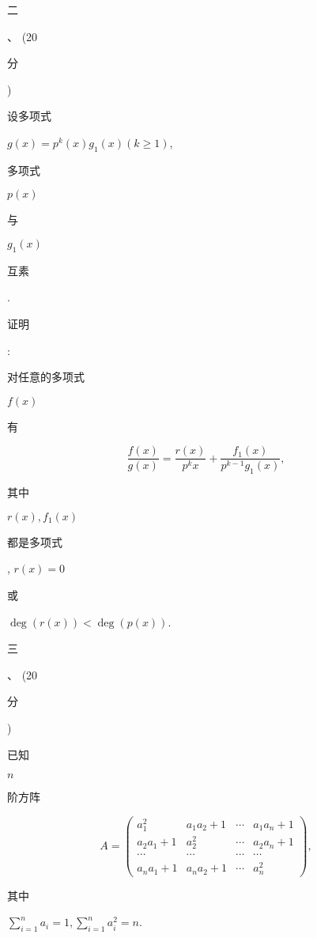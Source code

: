 \documentclass[10pt]{article}
\begin{document}
\begin{CJK}{UTF8}{mj}二\end{CJK}、 (20 \begin{CJK}{UTF8}{mj}分\end{CJK}) \begin{CJK}{UTF8}{mj}设多项式\end{CJK} $g(x)=p^{k}(x) g_{1}(x)(k \geq 1)$, \begin{CJK}{UTF8}{mj}多项式\end{CJK} $p(x)$ \begin{CJK}{UTF8}{mj}与\end{CJK} $g_{1}(x)$ \begin{CJK}{UTF8}{mj}互素\end{CJK}. \begin{CJK}{UTF8}{mj}证明\end{CJK}: \begin{CJK}{UTF8}{mj}对任意的多项式\end{CJK} $f(x)$ \begin{CJK}{UTF8}{mj}有\end{CJK}
$$
\frac{f(x)}{g(x)}=\frac{r(x)}{p^{k} x}+\frac{f_{1}(x)}{p^{k-1} g_{1}(x)},
$$
\begin{CJK}{UTF8}{mj}其中\end{CJK} $r(x), f_{1}(x)$ \begin{CJK}{UTF8}{mj}都是多项式\end{CJK}, $r(x)=0$ \begin{CJK}{UTF8}{mj}或\end{CJK} $\operatorname{deg}(r(x))<\operatorname{deg}(p(x))$.

\begin{CJK}{UTF8}{mj}三\end{CJK}、 (20 \begin{CJK}{UTF8}{mj}分\end{CJK}) \begin{CJK}{UTF8}{mj}已知\end{CJK} $n$ \begin{CJK}{UTF8}{mj}阶方阵\end{CJK}
$$
A=\left(\begin{array}{cccc}
a_{1}^{2} & a_{1} a_{2}+1 & \cdots & a_{1} a_{n}+1 \\
a_{2} a_{1}+1 & a_{2}^{2} & \cdots & a_{2} a_{n}+1 \\
\cdots & \cdots & \cdots & \cdots \\
a_{n} a_{1}+1 & a_{n} a_{2}+1 & \cdots & a_{n}^{2}
\end{array}\right),
$$
\begin{CJK}{UTF8}{mj}其中\end{CJK} $\sum_{i=1}^{n} a_{i}=1, \sum_{i=1}^{n} a_{i}^{2}=n$.
\end{document}
